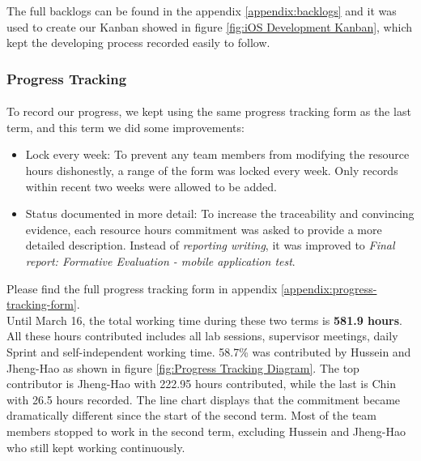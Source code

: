 \documentclass[12pt,a4paper]{article}
\begin{document}
          The full backlogs can be found in the appendix \ref{appendix:backlogs} and it was used to create our Kanban showed in figure \ref{fig:iOS Development Kanban}, which kept the developing process recorded easily to follow.        
          
        \subsubsection{Progress Tracking}
          \paragraph{}To record our progress, we kept using the same progress tracking form as the last term, and this term we did some improvements:

          \begin{itemize}
            \item {Lock every week}: To prevent any team members from modifying the resource hours dishonestly, a range of the form was locked every week. Only records within recent two weeks were allowed to be added. 
            \item {Status documented in more detail}: To increase the traceability and convincing evidence, each resource hours commitment was asked to provide a more detailed description. Instead of {\it reporting writing}, it was improved to {\it Final report: Formative Evaluation - mobile application test}.
          \end{itemize}

          Please find the full progress tracking form in appendix \ref{appendix:progress-tracking-form}.\\
          
          Until March 16, the total working time during these two terms is {\bf 581.9 hours}. All these hours contributed includes all lab sessions, supervisor meetings, daily Sprint and self-independent working time. 58.7\% was contributed by Hussein and Jheng-Hao as shown in figure \ref{fig:Progress Tracking Diagram}. The top contributor is Jheng-Hao with 222.95 hours contributed, while the last is Chin with 26.5 hours recorded. The line chart displays that the commitment became dramatically different since the start of the second term. Most of the team members stopped to work in the second term, excluding Hussein and Jheng-Hao who still kept working continuously.
          
\end{document}
